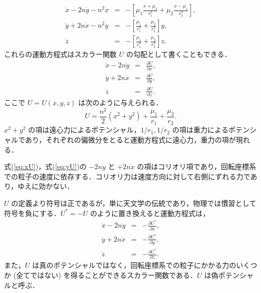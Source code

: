 \documentclass[11pt,a4paper,oneside,onecolumn]{jreport}
\begin{document}
\begin{eqnarray}
\ddot{x} - 2 n \dot{y} - n^2 x & = & - \left[ \mu_1 \frac{x + \mu_2}{r_1^3} + \mu_2 \frac{x - \mu_1}{r_2^3} \right],\\
\ddot{y} + 2 n \dot{x} - n^2 y & = & - \left[ \frac{\mu_1}{r_1^3} + \frac{\mu_2}{r_2^3} \right] y,\\
\ddot{z} & = & - \left[ \frac{\mu_1}{r_1^3} + \frac{\mu_2}{r_2^3} \right] z.
\end{eqnarray}
これらの運動方程式はスカラー関数 $U$ の勾配として書くこともできる．
\begin{eqnarray}
\ddot{x} - 2 n \dot{y} & = & \frac{\partial U}{\partial x}, \label{eq:xU}\\
\ddot{y} + 2 n \dot{x} & = & \frac{\partial U}{\partial y}, \label{eq:yU}\\
\ddot{z} & = & \frac{\partial U}{\partial z}. \label{eq:zU}
\end{eqnarray}
ここで $U = U (x, y, z)$ は次のように与えられる．
\begin{equation}
U = \frac{n^2}{2} (x^2 + y^2) + \frac{\mu_1}{r_1} + \frac{\mu_2}{r_2}. \label{eq:U}
\end{equation}
$x^2 + y^2$ の項は遠心力によるポテンシャル，$1/r_1, 1/r_2$ の項は重力によるポテンシャルであり，それぞれの偏微分をとると運動方程式に遠心力，重力の項が現れる．

式(\ref{eq:xU})，式(\ref{eq:yU})の $- 2n \dot{y}$ と $+ 2n \dot{x}$ の項はコリオリ項であり，回転座標系での粒子の速度に依存する．コリオリ力は速度方向に対して右側にずれる力であり，ゆえに効かない．

$U$ の定義より符号は正であるが，単に天文学の伝統であり，物理では慣習として符号を負にする．$U^{\ast} = - U$ のように置き換えると運動方程式は，
\begin{eqnarray}
\ddot{x} - 2 n \dot{y} & = & - \frac{\partial U^{\ast}}{\partial x}, \label{eq:xUast}\\
\ddot{y} + 2 n \dot{x} & = & - \frac{\partial U^{\ast}}{\partial y}, \label{eq:yUast}\\
\ddot{z} & = & - \frac{\partial U^{\ast}}{\partial z}. \label{eq:zUast}
\end{eqnarray}
また，$U$ は真のポテンシャルではなく，回転座標系での粒子にかかる力のいくつか (全てではない) を得ることができるスカラー関数である．$U$ は偽ポテンシャルと呼ぶ．
\end{document}
